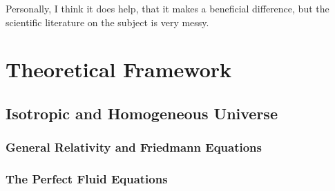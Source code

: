 


\begin{savequote}[50mm]
Personally, I think it does help, that it makes a beneficial difference, but the scientific literature on the subject is very messy.
\end{savequote}

\chapter{Theoretical Framework}
\label{cha:Theoretical Framework}

\ifpdf
    \graphicspath{{2_state_of_the_art/figures/PNG/}{2_state_of_the_art/figures/PDF/}{2_state_of_the_art/figures/}}
\else
    \graphicspath{{2_state_of_the_art/figures/EPS/}{2_state_of_the_art/figures/}}
\fi





\section{Isotropic and Homogeneous Universe}
\label{sec:IsotropicAndHomogeneousUniverse}


	\subsection{General Relativity and Friedmann Equations}
	\label{subsec:GeneralRelativityAndFriedmannEquations}


	\subsection{The Perfect Fluid Equations}
	\label{subsec:ThePerfectFluidEquations}


